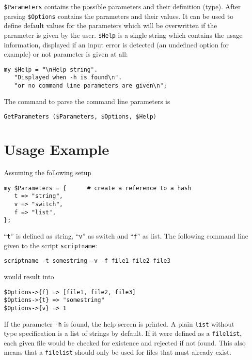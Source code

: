 \documentclass[12pt, a4paper]{article}
\begin{document}
\verb'$Parameters' contains the possible parameters and their definition (type). After parsing \verb'$Options' contains the parameters and their values. It can be used to define default values for the parameters which will be overwritten if the parameter is given by the user. \verb'$Help' is a single string which contains the usage information, displayed if an input error is detected (an undefined option for example) or not parameter is given at all:

\begin{verbatim}
my $Help = "\nHelp string".
   "Displayed when -h is found\n".
   "or no command line parameters are given\n";
\end{verbatim}

The command to parse the command line parameters is

\begin{verbatim}
GetParameters ($Parameters, $Options, $Help)
\end{verbatim}




\section{Usage Example}

Assuming the following setup

\begin{verbatim}
my $Parameters = {      # create a reference to a hash
   t => "string",
   v => "switch",
   f => "list",
};
\end{verbatim}

``\verb't''' is defined as string, ``\verb'v''' as switch and ``\verb'f''' as list. The following command line given to the script \verb'scriptname':

\begin{verbatim}
scriptname -t somestring -v -f file1 file2 file3
\end{verbatim}

would result into

\begin{verbatim}
$Options->{f} => [file1, file2, file3]
$Options->{t} => "somestring"
$Options->{v} => 1
\end{verbatim}

If the parameter \verb'-h' is found, the help screen is printed. A plain \verb'list' without type specification is a list of strings by default. If it were defined as a \verb'filelist', each given file would be checked for existence and rejected if not found. This also means that a \verb'filelist' should only be used for files that must already exist.
\end{document}
